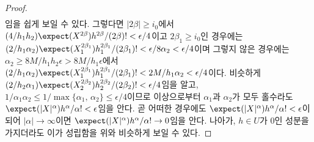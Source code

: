 \begin{proof}
\begin{align*}
    \end{align*}
    임을 쉽게 보일 수 있다. 그렇다면 $|2\beta|\geq i_0$에서 $(4/h_1h_2)\expect(X^{2\beta})h^{2\beta}/(2\beta)!<\epsilon/4$이고 $2\beta_1\geq i_0$인 경우에는 $(2/h_1\alpha_2)\expect(X_1^{2\beta_1})h_1^{2\beta_1}/(2\beta_1)!<\epsilon/8\alpha_2<\epsilon/4$이며 그렇지 않은 경우에는 $\alpha_2\geq 8M/h_1h_2\epsilon>8M/h_1\epsilon$에서 $(2/h_1\alpha_2)\expect(X_1^{2\beta_1})h_1^{2\beta_1}/(2\beta_1)!<2M/h_1\alpha_2<\epsilon/4$이다. 비슷하게 $(2/h_2\alpha_1)\expect(X_2^{2\beta_2})h_2^{2\beta_2}/(2\beta_2)!<\epsilon/4$임을 알고, $1/\alpha_1\alpha_2\leq1/\max\{\alpha_1,\,\alpha_2\}\leq\epsilon/4$이므로 이상으로부터 $\alpha_1$과 $\alpha_2$가 모두 홀수라도 $\expect(|X|^\alpha)h^\alpha/\alpha!<\epsilon$임을 안다. 곧 어떠한 경우에도 $\expect(|X|^\alpha)h^\alpha/\alpha!<\epsilon$이 되어 $|\alpha|\to\infty$이면 $\expect(|X|^\alpha)h^\alpha/\alpha!\to0$임을 안다. 나아가, $h\in U$가 $0$인 성분을 가지더라도 이가 성립함을 위와 비슷하게 보일 수 있다.
    

\end{proof}
